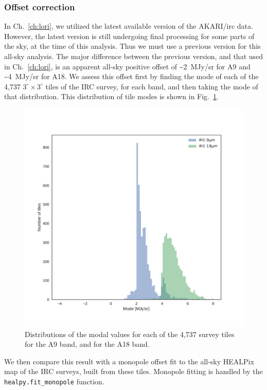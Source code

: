     \subsubsection{Offset correction}
    In Ch.~\ref{ch:lori}, we utilized the latest available version of the AKARI/\gls{irc} data. However, the latest version is still undergoing final processing for some parts of the sky, at the time of this analysis. Thus we must use a previous version for this all-sky analysis. The major difference between the previous version, and that used in Ch.~\ref{ch:lori}, is an apparent all-sky positive offset of \textasciitilde{}2~MJy/sr for A9 and \textasciitilde{}4~MJy/sr for A18. We assess this offset first by finding the mode of each of the 4,737 $3^{\circ}\times3^{\circ}$ tiles of the IRC survey, for each band, and then taking the mode of that distribution. This distribution of tile modes is shown in Fig.~\ref{fig:allsky_2016_tilemodes}.
        \begin{figure}
          \includegraphics[width=\textwidth]{../Plots/ch_allsky/IRC_offset_correction.pdf}
          \centering
          \caption{Distributions of the modal values for each of the 4,737 survey tiles for the A9 band, and for the A18 band.}
          \label{fig:allsky_2016_tilemodes}
        \end{figure}
      We then compare this result with a monopole offset fit to the all-sky HEALPix map of the IRC surveys, built from these tiles. Monopole fitting is handled by the {\tt healpy.fit\_monopole} function.
